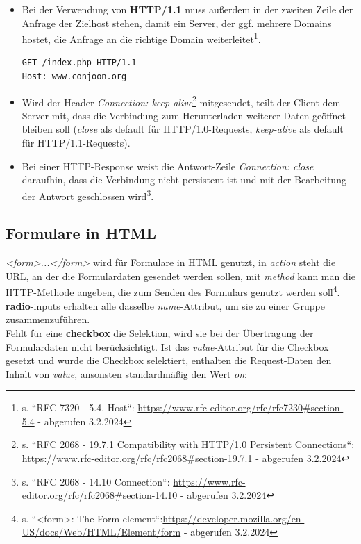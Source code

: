 \begin{itemize}
    \item Bei der Verwendung von \textbf{HTTP/1.1} muss außerdem in der zweiten Zeile der Anfrage der Zielhost stehen, damit ein Server, der {ggf.} mehrere Domains hostet, die Anfrage an die richtige Domain weiterleitet\footnote{s. ``RFC 7320 - 5.4.  Host``: \url{https://www.rfc-editor.org/rfc/rfc7230#section-5.4} - abgerufen 3.2.2024}.
    \begin{verbatim}
GET /index.php HTTP/1.1
Host: www.conjoon.org
    \end{verbatim}
    \item Wird der Header \textit{Connection: keep-alive}\footnote{
    s. ``RFC 2068 - 19.7.1 Compatibility with HTTP/1.0 Persistent Connections``: \url{https://www.rfc-editor.org/rfc/rfc2068#section-19.7.1} - abgerufen 3.2.2024
    } mitgesendet, teilt der Client dem Server mit, dass die Verbindung zum Herunterladen weiterer Daten geöffnet bleiben soll (\textit{close} als default für HTTP/1.0-Requests, \textit{keep-alive} als default für HTTP/1.1-Requests).
    \item Bei einer HTTP-Response weist die Antwort-Zeile \textit{Connection: close} daraufhin, dass die Verbindung nicht persistent ist und mit der Bearbeitung der Antwort geschlossen wird\footnote{
    s. ``RFC 2068 - 14.10 Connection``: \url{https://www.rfc-editor.org/rfc/rfc2068#section-14.10} - abgerufen 3.2.2024
    }.
\end{itemize}

\subsection{Formulare in HTML}

\textit{<form>...</form>} wird für Formulare in HTML genutzt, in \textit{action} steht die URL, an der die Formulardaten gesendet werden sollen, mit \textit{method} kann man die HTTP-Methode angeben, die zum Senden des Formulars genutzt werden soll\footnote{
s. ``<form>: The Form element``:\url{https://developer.mozilla.org/en-US/docs/Web/HTML/Element/form} - abgerufen 3.2.2024
}.\\

\noindent
\textbf{radio}-inputs erhalten alle dasselbe \textit{name}-Attribut, um sie zu einer Gruppe zusammenzuführen.\\

\noindent
Fehlt für eine \textbf{checkbox} die Selektion, wird sie bei der Übertragung der Formulardaten nicht berücksichtigt.
Ist das \textit{value}-Attribut für die Checkbox gesetzt und wurde die Checkbox selektiert, enthalten die Request-Daten den Inhalt von \textit{value}, ansonsten standardmäßig den Wert \textit{on}:


